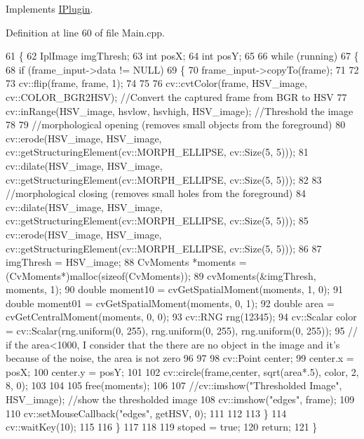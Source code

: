 Implements \hyperlink{class_i_plugin_ab5fdb3b0f7afdcee04324dca01766749}{I\+Plugin}.



Definition at line 60 of file Main.\+cpp.


\begin{DoxyCode}
61 \{
62     IplImage imgThresh;
63     \textcolor{keywordtype}{int} posX;
64     \textcolor{keywordtype}{int} posY;
65 
66     \textcolor{keywordflow}{while} (running)
67     \{
68         \textcolor{keywordflow}{if} (frame\_input->data != NULL)
69         \{
70             frame\_input->copyTo(frame);
71 
72 
73             cv::flip(frame, frame, 1);
74 
75 
76             cv::cvtColor(frame, HSV\_image, cv::COLOR\_BGR2HSV); \textcolor{comment}{//Convert the captured frame from BGR to HSV}
77             cv::inRange(HSV\_image, hsvlow, hsvhigh, HSV\_image); \textcolor{comment}{//Threshold the image}
78 
79             \textcolor{comment}{//morphological opening (removes small objects from the foreground)}
80             cv::erode(HSV\_image, HSV\_image, cv::getStructuringElement(cv::MORPH\_ELLIPSE, cv::Size(5, 5)));
81             cv::dilate(HSV\_image, HSV\_image, cv::getStructuringElement(cv::MORPH\_ELLIPSE, cv::Size(5, 5)));
82 
83             \textcolor{comment}{//morphological closing (removes small holes from the foreground)}
84             cv::dilate(HSV\_image, HSV\_image, cv::getStructuringElement(cv::MORPH\_ELLIPSE, cv::Size(5, 5)));
85             cv::erode(HSV\_image, HSV\_image, cv::getStructuringElement(cv::MORPH\_ELLIPSE, cv::Size(5, 5)));
86 
87             imgThresh = HSV\_image;
88             CvMoments *moments = (CvMoments*)malloc(\textcolor{keyword}{sizeof}(CvMoments));
89             cvMoments(&imgThresh, moments, 1);
90             \textcolor{keywordtype}{double} moment10 = cvGetSpatialMoment(moments, 1, 0);
91             \textcolor{keywordtype}{double} moment01 = cvGetSpatialMoment(moments, 0, 1);
92             \textcolor{keywordtype}{double} area = cvGetCentralMoment(moments, 0, 0);
93             cv::RNG rng(12345);
94             cv::Scalar color = cv::Scalar(rng.uniform(0, 255), rng.uniform(0, 255), rng.uniform(0, 255));
95             \textcolor{comment}{// if the area<1000, I consider that the there are no object in the image and it's because of
       the noise, the area is not zero}
96 
97 
98             cv::Point center;
99             center.x = posX;
100             center.y = posY;
101 
102             cv::circle(frame,center, sqrt(area*.5), color, 2, 8, 0);
103 
104 
105             free(moments);
106 
107             \textcolor{comment}{//cv::imshow("Thresholded Image", HSV\_image); //show the thresholded image}
108             cv::imshow(\textcolor{stringliteral}{"edges"}, frame);
109 
110             cv::setMouseCallback(\textcolor{stringliteral}{"edges"}, getHSV, 0);
111             
112 
113         \}
114         cv::waitKey(10);
115         
116     \}
117    
118 
119     stoped = \textcolor{keyword}{true};
120     \textcolor{keywordflow}{return};
121 \}
\end{DoxyCode}
\mbox{\label{class_color___tracker_a77d5ddbb266c0a13963fae15285ccc37}} 
